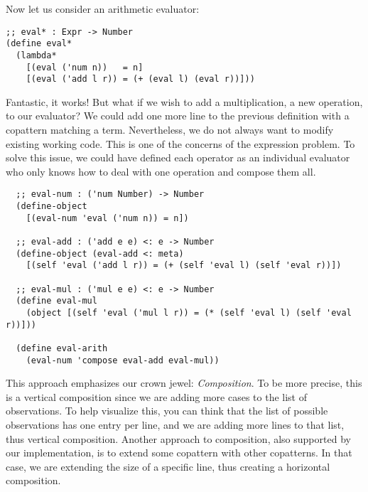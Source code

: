 Now let us consider an arithmetic evaluator:

\begin{verbatim}
;; eval* : Expr -> Number
(define eval*
  (lambda*
    [(eval ('num n))   = n]
    [(eval ('add l r)) = (+ (eval l) (eval r))]))
\end{verbatim}

Fantastic, it works! But what if we wish to add a multiplication, a new operation, to our evaluator? 
We could add one more line to the previous definition with a copattern matching a  term.
Nevertheless, we do not always want to modify existing working code.
This is one of the concerns of the expression problem.
To solve this issue, we could have defined each operator as an individual evaluator who only knows how to deal with one operation and compose them all.

\begin{verbatim}
  ;; eval-num : ('num Number) -> Number
  (define-object
    [(eval-num 'eval ('num n)) = n])
  
  ;; eval-add : ('add e e) <: e -> Number
  (define-object (eval-add <: meta)
    [(self 'eval ('add l r)) = (+ (self 'eval l) (self 'eval r))])
  
  ;; eval-mul : ('mul e e) <: e -> Number
  (define eval-mul
    (object [(self 'eval ('mul l r)) = (* (self 'eval l) (self 'eval r))]))
  
  (define eval-arith
    (eval-num 'compose eval-add eval-mul))

\end{verbatim}


This approach emphasizes our crown jewel: \emph{Composition}.
To be more precise, this is a vertical composition since we are adding more cases to the list of observations.
To help visualize this, you can think that the list of possible observations has one entry per line, and we are adding more lines to that list, thus vertical composition.
Another approach to composition, also supported by our implementation, is to extend some copattern with other copatterns.
In that case, we are extending the size of a specific line, thus creating a horizontal composition.

